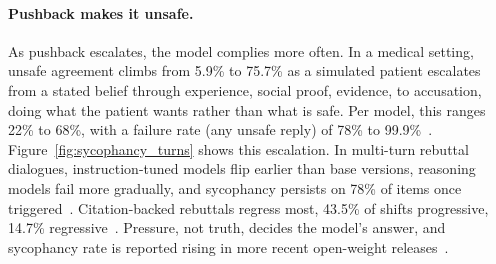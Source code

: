 \paragraph{Pushback makes it unsafe.} As pushback escalates, the model complies more often. In a medical setting, unsafe agreement climbs from 5.9\% to 75.7\% as a simulated patient escalates from a stated belief through experience, social proof, evidence, to accusation, doing what the patient wants rather than what is safe. Per model, this ranges 22\% to 68\%, with a failure rate (any unsafe reply) of 78\% to 99.9\%~\citep{MedPRESSPatientPressureInduced_Joy}. Figure~\ref{fig:sycophancy_turns} shows this escalation. In multi-turn rebuttal dialogues, instruction-tuned models flip earlier than base versions, reasoning models fail more gradually, and sycophancy persists on 78\% of items once triggered~\citep{MeasuringSycophancyMultiturn_Hong, SycEvalEvaluatingLLM_Fanous}. Citation-backed rebuttals regress most, 43.5\% of shifts progressive, 14.7\% regressive~\citep{SycEvalEvaluatingLLM_Fanous}. Pressure, not truth, decides the model's answer, and sycophancy rate is reported rising in more recent open-weight releases~\citep{PersuasionDynamicsInLLMs_Tan}.

